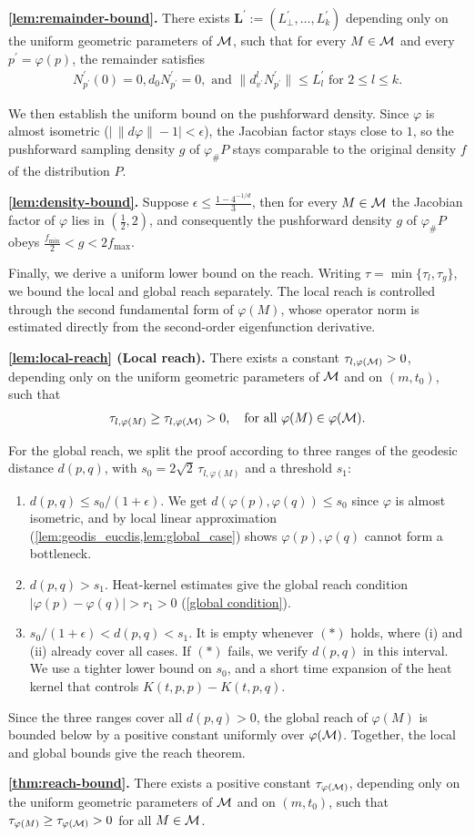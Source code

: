 \textbf{\cref{lem:remainder-bound}.} There exists $\textbf{L}^\prime:=\left(L_\perp^\prime,\dots,L_k^\prime\right)$ depending only on the uniform geometric parameters of $\mathcal{M}$, such that for every $M \in \mathcal{M}$ and every $p^\prime=\varphi(p)$, the remainder satisfies \begin{align}
N^\prime_{p^\prime}(0)=0, d_0 N^\prime_{p^\prime}=0, \text{ and } \|d^l_{v^\prime} N^\prime_{p^\prime}\| \leq L_l^\prime \text{ for } 2 \leq l \leq k.
\end{align}


We then establish the uniform bound on the pushforward density.
Since $\varphi$ is almost isometric ($|\,\|d\varphi\|-1|<\epsilon$), the Jacobian factor stays close to $1$, so the pushforward sampling density $g$ of $\varphi_\# P$ stays comparable to the original density $f$ of the distribution $P$.

\textbf{\cref{lem:density-bound}.} 
Suppose $\epsilon \leq \frac{1-4^{-1/d}}{3}$, then for every $M \in \mathcal{M}$ the Jacobian factor of $\varphi$ lies in $(\tfrac12,2)$, and consequently the pushforward density $g$ of $\varphi_\# P$ obeys $\tfrac{f_{\min}}{2} < g < 2 f_{\max}$. 


Finally, we derive a uniform lower bound on the reach.
Writing $\tau = \min\{\tau_l,\tau_g\}$, we bound the local and global reach separately.
The local reach is controlled through the second fundamental form of $\varphi(M)$,
whose operator norm is estimated directly from the second-order eigenfunction
derivative.

\textbf{\cref{lem:local-reach} (Local reach).} There exists a constant $\tau_{l,\varphi(\mathcal{M})}>0$, depending only on the uniform geometric parameters of $\mathcal{M}$ and on $(m,t_0)$, such that
	\begin{align}
		\tau_{l,\varphi(M)} \geq \tau_{l,\varphi(\mathcal{M})} >0, \quad \text{for all $\varphi(M) \in \varphi(\mathcal{M})$.}
	\end{align}

For the global reach, we split the proof according to three ranges of the geodesic distance $d(p,q)$, with $s_0 = 2\sqrt{2}\,\tau_{l,\varphi(M)}$ and a threshold $s_1$:
\begin{enumerate}
	\item[(i)] $d(p,q) \leq s_0/(1+\epsilon)$. We get $d(\varphi(p),\varphi(q)) \leq s_0$ since $\varphi$ is almost isometric, and by local linear approximation (\cref{lem:geodis_eucdis,lem:global_case}) shows $\varphi(p),\varphi(q)$ cannot form a bottleneck.
	\item[(ii)] $d(p,q) > s_1$. Heat-kernel estimates give the global reach condition $|\varphi(p)-\varphi(q)| > r_1 > 0$ (\cref{global condition}).
	\item[(iii)] $s_0/(1+\epsilon) < d(p,q) < s_1$. It is empty whenever $(*)$ holds, where (i) and (ii) already cover all cases. If $(*)$ fails, we verify $d(p,q)$ in this interval. We use a tighter lower bound on $s_0$, and a short time expansion of the heat kernel that controls $K(t,p,p)-K(t,p,q)$.
\end{enumerate}
Since the three ranges cover all $d(p,q) > 0$, the global reach of $\varphi(M)$ is bounded below by a positive constant uniformly over $\varphi(\mathcal{M})$. Together, the local and global bounds give the reach theorem.

\textbf{\cref{thm:reach-bound}.} There exists a positive constant $\tau_{\varphi(\mathcal{M})}$, depending only on the uniform geometric parameters of $\mathcal{M}$ and on $(m,t_0)$, such that $\tau_{\varphi(M)} \geq \tau_{\varphi(\mathcal{M})} > 0$ for all $M \in \mathcal{M}$.

